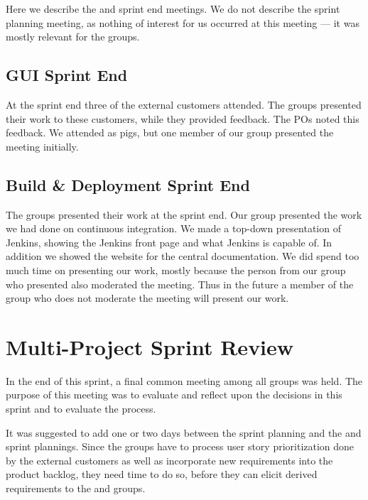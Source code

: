 Here we describe the \gui and \bd sprint end meetings. We do not describe the \db sprint planning meeting, as nothing of interest for us occurred at this meeting --- it was mostly relevant for the \gui groups.


\subsection{GUI Sprint End}
At the \gui sprint end three of the external customers attended. The \gui groups presented their work to these customers, while they provided feedback. The \gui POs noted this feedback. We attended as pigs, but one member of our group presented the meeting initially.

\subsection{Build \& Deployment Sprint End}
The \bd groups presented their work at the \bd sprint end. Our group presented the work we had done on continuous integration. We made a top-down presentation of Jenkins, showing the Jenkins front page and what Jenkins is capable of. In addition we showed the website for the central documentation. We did spend too much time on presenting our work, mostly because the person from our group who presented also moderated the meeting. Thus in the future a member of the group who does not moderate the meeting will present our work.

\section{Multi-Project Sprint Review}
In the end of this sprint, a final common meeting among all groups was held. The purpose of this meeting was to evaluate and reflect upon the decisions in this sprint and to evaluate the process.

It was suggested to add one or two days between the \gui sprint planning and the \db and \bd sprint plannings. Since the \gui groups have to process user story prioritization done by the external customers as well as incorporate new requirements into the product backlog, they need time to do so, before they can elicit derived requirements to the \db and \bd groups.

